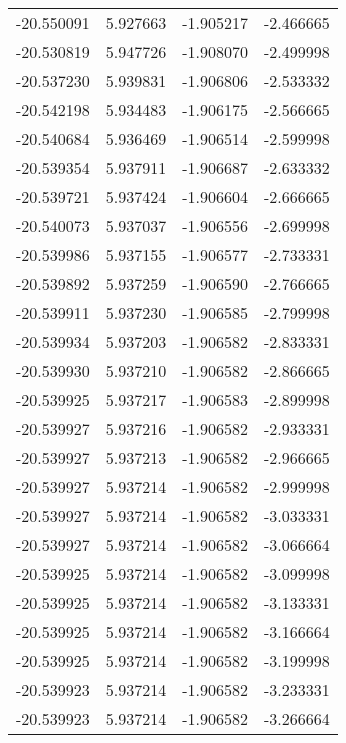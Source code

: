 \begin{tabular}{rrrr}
      -20.550091 &         5.927663 &   -1.905217 &  -2.466665 \\
      -20.530819 &         5.947726 &   -1.908070 &  -2.499998 \\
      -20.537230 &         5.939831 &   -1.906806 &  -2.533332 \\
      -20.542198 &         5.934483 &   -1.906175 &  -2.566665 \\
      -20.540684 &         5.936469 &   -1.906514 &  -2.599998 \\
      -20.539354 &         5.937911 &   -1.906687 &  -2.633332 \\
      -20.539721 &         5.937424 &   -1.906604 &  -2.666665 \\
      -20.540073 &         5.937037 &   -1.906556 &  -2.699998 \\
      -20.539986 &         5.937155 &   -1.906577 &  -2.733331 \\
      -20.539892 &         5.937259 &   -1.906590 &  -2.766665 \\
      -20.539911 &         5.937230 &   -1.906585 &  -2.799998 \\
      -20.539934 &         5.937203 &   -1.906582 &  -2.833331 \\
      -20.539930 &         5.937210 &   -1.906582 &  -2.866665 \\
      -20.539925 &         5.937217 &   -1.906583 &  -2.899998 \\
      -20.539927 &         5.937216 &   -1.906582 &  -2.933331 \\
      -20.539927 &         5.937213 &   -1.906582 &  -2.966665 \\
      -20.539927 &         5.937214 &   -1.906582 &  -2.999998 \\
      -20.539927 &         5.937214 &   -1.906582 &  -3.033331 \\
      -20.539927 &         5.937214 &   -1.906582 &  -3.066664 \\
      -20.539925 &         5.937214 &   -1.906582 &  -3.099998 \\
      -20.539925 &         5.937214 &   -1.906582 &  -3.133331 \\
      -20.539925 &         5.937214 &   -1.906582 &  -3.166664 \\
      -20.539925 &         5.937214 &   -1.906582 &  -3.199998 \\
      -20.539923 &         5.937214 &   -1.906582 &  -3.233331 \\
      -20.539923 &         5.937214 &   -1.906582 &  -3.266664 \\

\end{tabular}
